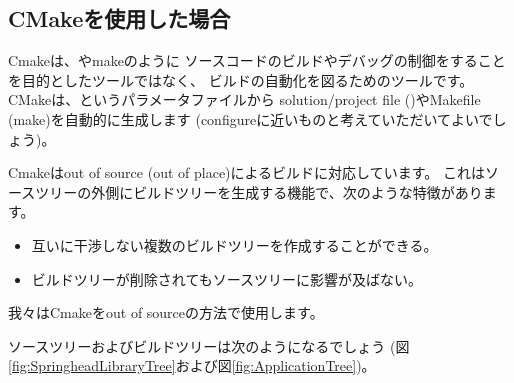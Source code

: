 \subsection{CMakeを使用した場合}
\label{subsec:WhenUsedCMake}

\noindent
Cmakeは、\VS やmakeのように
ソースコードのビルドやデバッグの制御をすることを目的としたツールではなく、
ビルドの自動化を図るためのツールです。
CMakeは、\CMakeLists{}というパラメータファイルから
solution/project file (\VS)やMakefile (make)を自動的に生成します
(configureに近いものと考えていただいてよいでしょう)。

\medskip
\noindent
Cmakeはout of source (out of place)によるビルドに対応しています。
これはソースツリーの外側にビルドツリーを生成する機能で、次のような特徴があります。
\begin{itemize}
  \item	互いに干渉しない複数のビルドツリーを作成することができる。
  \item	ビルドツリーが削除されてもソースツリーに影響が及ばない。
\end{itemize}
我々はCmakeをout of sourceの方法で使用します。

\medskip
\noindent
ソースツリーおよびビルドツリーは次のようになるでしょう
(図\ref{fig:SpringheadLibraryTree}および図\ref{fig:ApplicationTree})。

